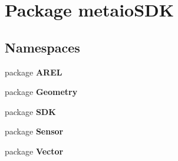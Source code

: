 \section{Package metaio\-S\-D\-K}
\label{namespacemetaio_s_d_k}
\subsection*{Namespaces}
\begin{DoxyCompactItemize}
\item 
package {\bf A\-R\-E\-L}
\item 
package {\bf Geometry}
\item 
package {\bf S\-D\-K}
\item 
package {\bf Sensor}
\item 
package {\bf Vector}
\end{DoxyCompactItemize}
